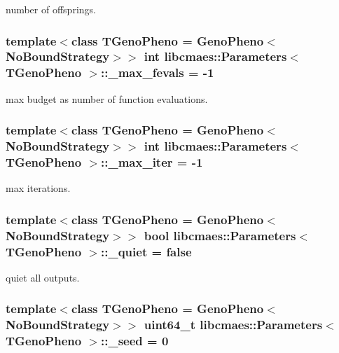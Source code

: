 number of offsprings. \hypertarget{classlibcmaes_1_1Parameters_ad316488121bd51f62b28e8183d591c9e}{
\subsubsection[{\-\_\-max\-\_\-fevals}]{\setlength{\rightskip}{0pt plus 5cm}template$<$class T\-Geno\-Pheno = Geno\-Pheno$<$\-No\-Bound\-Strategy$>$$>$ int {\bf libcmaes\-::\-Parameters}$<$ T\-Geno\-Pheno $>$\-::\-\_\-max\-\_\-fevals = -\/1}}\label{classlibcmaes_1_1Parameters_ad316488121bd51f62b28e8183d591c9e}
max budget as number of function evaluations. \hypertarget{classlibcmaes_1_1Parameters_a60abfc730c5aa46e42ebd1598b59caa6}{
\subsubsection[{\-\_\-max\-\_\-iter}]{\setlength{\rightskip}{0pt plus 5cm}template$<$class T\-Geno\-Pheno = Geno\-Pheno$<$\-No\-Bound\-Strategy$>$$>$ int {\bf libcmaes\-::\-Parameters}$<$ T\-Geno\-Pheno $>$\-::\-\_\-max\-\_\-iter = -\/1}}\label{classlibcmaes_1_1Parameters_a60abfc730c5aa46e42ebd1598b59caa6}
max iterations. \hypertarget{classlibcmaes_1_1Parameters_a6f6dad55c02a23891e3280cad288295a}{
\subsubsection[{\-\_\-quiet}]{\setlength{\rightskip}{0pt plus 5cm}template$<$class T\-Geno\-Pheno = Geno\-Pheno$<$\-No\-Bound\-Strategy$>$$>$ bool {\bf libcmaes\-::\-Parameters}$<$ T\-Geno\-Pheno $>$\-::\-\_\-quiet = false}}\label{classlibcmaes_1_1Parameters_a6f6dad55c02a23891e3280cad288295a}
quiet all outputs. \hypertarget{classlibcmaes_1_1Parameters_ac6d616c3d5295fec8a0b230592fb767a}{
\subsubsection[{\-\_\-seed}]{\setlength{\rightskip}{0pt plus 5cm}template$<$class T\-Geno\-Pheno = Geno\-Pheno$<$\-No\-Bound\-Strategy$>$$>$ uint64\-\_\-t {\bf libcmaes\-::\-Parameters}$<$ T\-Geno\-Pheno $>$\-::\-\_\-seed = 0}}\label{classlibcmaes_1_1Parameters_ac6d616c3d5295fec8a0b230592fb767a}
